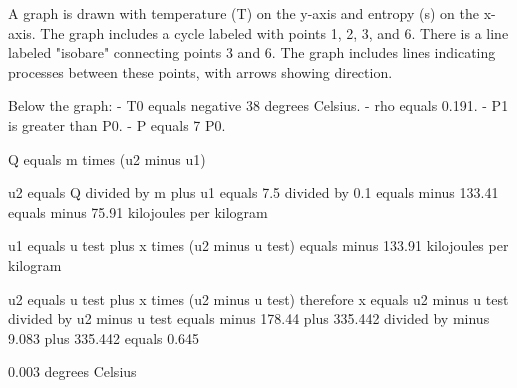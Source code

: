 A graph is drawn with temperature (T) on the y-axis and entropy (s) on the x-axis. The graph includes a cycle labeled with points 1, 2, 3, and 6. There is a line labeled "isobare" connecting points 3 and 6. The graph includes lines indicating processes between these points, with arrows showing direction. 

Below the graph:
- T0 equals negative 38 degrees Celsius.
- rho equals 0.191.
- P1 is greater than P0.
- P equals 7 P0.

Q equals m times (u2 minus u1)

u2 equals Q divided by m plus u1 equals 7.5 divided by 0.1 equals minus 133.41 equals minus 75.91 kilojoules per kilogram

u1 equals u test plus x times (u2 minus u test) equals minus 133.91 kilojoules per kilogram

u2 equals u test plus x times (u2 minus u test) therefore x equals u2 minus u test divided by u2 minus u test equals minus 178.44 plus 335.442 divided by minus 9.083 plus 335.442 equals 0.645

0.003 degrees Celsius